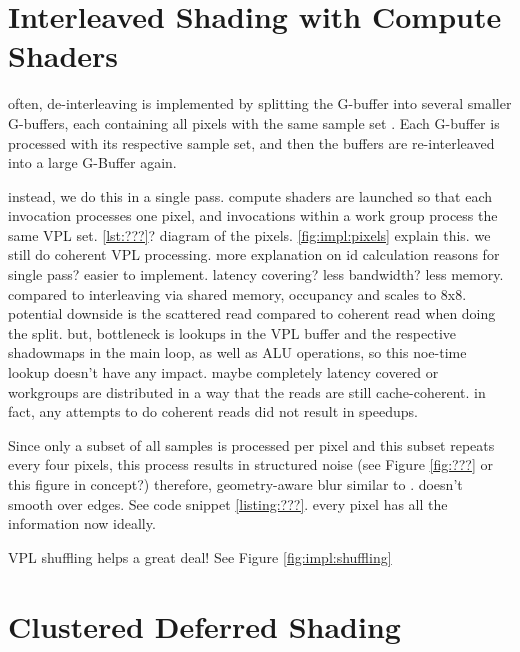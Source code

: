 \section{Interleaved Shading with Compute Shaders}
\label{sec:impl:interleavedShading}
\begin{outline}
\1 often, de-interleaving is implemented by splitting the G-buffer into several smaller G-buffers, each containing all pixels with the same sample set \cite{segovia2006non}. Each G-buffer is processed with its respective sample set, and then the buffers are re-interleaved into a large G-Buffer again.

\1 instead, we do this in a single pass. compute shaders are launched so that each invocation processes one pixel, and invocations within a work group process the same VPL set.
\1 \ref{lst:???}?
\1 diagram of the pixels. \ref{fig:impl:pixels} explain this. we still do coherent VPL processing.
\1 more explanation on id calculation
\1 reasons for single pass? easier to implement. latency covering? less bandwidth? less memory. compared to interleaving via shared memory, occupancy and scales to 8x8.
\1 potential downside is the scattered read compared to coherent read when doing the split. but, bottleneck is lookups in the VPL buffer and the respective shadowmaps in the main loop, as well as ALU operations, so this noe-time lookup doesn't have any impact. maybe completely latency covered or workgroups are distributed in a way that the reads are still cache-coherent.
\1 in fact, any attempts to do coherent reads did not result in speedups.

\1 Since only a subset of all samples is processed per pixel and this subset repeats every four pixels, this process results in structured noise (see Figure \ref{fig:???} or this figure in concept?)
\1 therefore, geometry-aware blur similar to \citet{laine2007incremental}. doesn't smooth over edges. See code snippet \ref{listing:???}. every pixel has all the information now ideally.

\1 VPL shuffling helps a great deal! See Figure \ref{fig:impl:shuffling}
\end{outline}

\section{Clustered Deferred Shading}
\label{sec:impl:clusteredShading}

